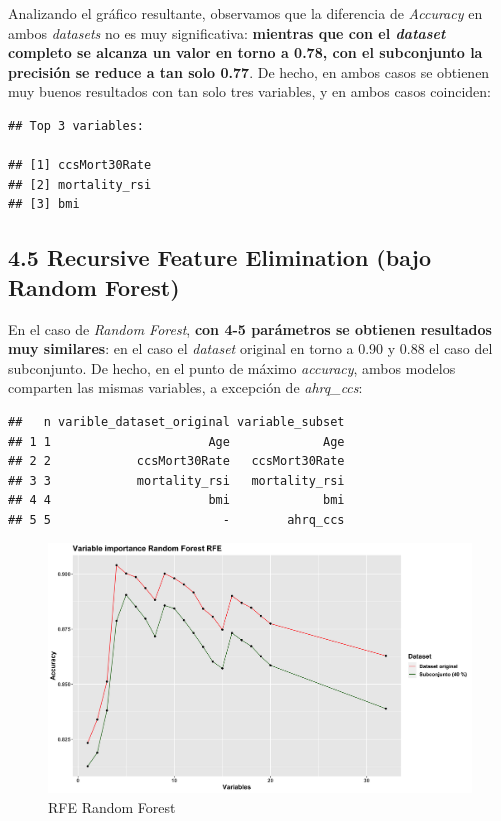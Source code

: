 \documentclass[
]{article}
\begin{document}
Analizando el gráfico resultante, observamos que la diferencia de
\emph{Accuracy} en ambos \emph{datasets} no es muy significativa:
\textbf{mientras que con el \emph{dataset} completo se alcanza un valor
en torno a 0.78, con el subconjunto la precisión se reduce a tan solo
0.77}. De hecho, en ambos casos se obtienen muy buenos resultados con
tan solo tres variables, y en ambos casos coinciden:

\begin{verbatim}
## Top 3 variables:

## [1] ccsMort30Rate
## [2] mortality_rsi
## [3] bmi
\end{verbatim}

\hypertarget{recursive-feature-elimination-bajo-random-forest}{%
\subsection{4.5 Recursive Feature Elimination (bajo Random
Forest)}\label{recursive-feature-elimination-bajo-random-forest}}

En el caso de \emph{Random Forest}, \textbf{con 4-5 parámetros se
obtienen resultados muy similares}: en el caso el \emph{dataset}
original en torno a 0.90 y 0.88 el caso del subconjunto. De hecho, en el
punto de máximo \emph{accuracy}, ambos modelos comparten las mismas
variables, a excepción de \emph{ahrq\_ccs}:

\begin{verbatim}
##   n varible_dataset_original variable_subset
## 1 1                      Age             Age
## 2 2            ccsMort30Rate   ccsMort30Rate
## 3 3            mortality_rsi   mortality_rsi
## 4 4                      bmi             bmi
## 5 5                        -        ahrq_ccs
\end{verbatim}

\newpage
\begin{figure}[h!]

{\centering \includegraphics[width=0.99\linewidth,height=0.99\textheight,]{./charts/01_feature_selection_RFE_RF_whole_dataset} 

}

\caption{RFE Random Forest}\label{fig:unnamed-chunk-36}
\end{figure}
\end{document}
